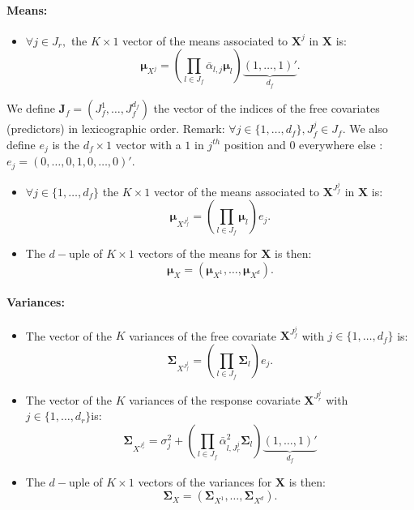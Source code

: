 \documentclass[12pt,a4paper]{report}
\begin{document}
\paragraph{Means:}
\begin{itemize} 
\item $\forall j \in J_r,$ the $K \times 1$ vector of the means associated to $\boldsymbol{X}^j$ in $\boldsymbol{X}$ is:
	\begin{equation}
		\boldsymbol{\mu}_{X^{j}}=(\prod_{l \in J_f}\bar{\alpha}_{l,j}\boldsymbol{\mu}_l)\underbrace{(1,\dots,1)'}_{d_f} .\label{meangauche}
	\end{equation}
\end{itemize}
We define $\boldsymbol{J}_f=(J_f^1,\dots,J_f^{d_f}) $ the vector of the indices of the free covariates (predictors) in lexicographic order. Remark: $\forall j \in \{1,\dots,d_f\}, J_f^j \in J_f$. We also define $e_j$ is the $d_f \times 1$ vector with a $1$ in $j^{th}$ position and $0$ everywhere else : 
\mbox{$e_j=(0,\dots,0,1,0,\dots,0)'$}.
\begin{itemize}
	\item $\forall j \in \{1,\dots,d_f\}$ the $K \times 1$ vector of the means associated to $\boldsymbol{X}^{J_f^j}$ in $\boldsymbol{X}$ is:
	\begin{equation}
		\boldsymbol{\mu}_{X^{J_f^j}}=(\prod_{l \in J_f}\boldsymbol{\mu}_l)e_j .\label{meandroite}
	\end{equation} 
	\item The $d-$uple of $K\times 1$ vectors of the means for $\boldsymbol{X}$ is then:
		\begin{equation}
			\boldsymbol{\mu}_X=(\boldsymbol{\mu}_{X^1},\dots,\boldsymbol{\mu}_{X^d}).  \nonumber 
		\end{equation}
\end{itemize}
\paragraph{Variances:}
\begin{itemize}
	\item The vector of the $K$ variances of the free covariate $\boldsymbol{X}^{J_f^j}$ with $j \in \{1,\dots,d_f \}$ is:
		\begin{equation}
			\boldsymbol{\Sigma}_{X^{J_f^j}}=(\prod_{l \in J_f}\boldsymbol{\Sigma}_l)e_j. \nonumber 
		\end{equation}
	\item The vector of the $K$ variances of the response covariate $\boldsymbol{X}^{J_r^j}$ with $j \in \{1,\dots,d_r \} $is:
	\begin{equation}
		\boldsymbol{\Sigma}_{X^{J_r^j}}=\sigma_j^2+(\prod_{l \in J_f}\bar{\alpha}_{l,J_r^j}^2\boldsymbol{\Sigma}_l)\underbrace{(1,\dots,1)'}_{d_f}  \nonumber 
	\end{equation}
	\item The $d-$uple of $K\times 1$ vectors of the variances for $\boldsymbol{X}$ is then:
		\begin{equation}
			\boldsymbol{\Sigma}_X=(\boldsymbol{\Sigma}_{X^1},\dots,\boldsymbol{\Sigma}_{X^d}). \nonumber 
		\end{equation}	
\end{itemize}
\end{document}
